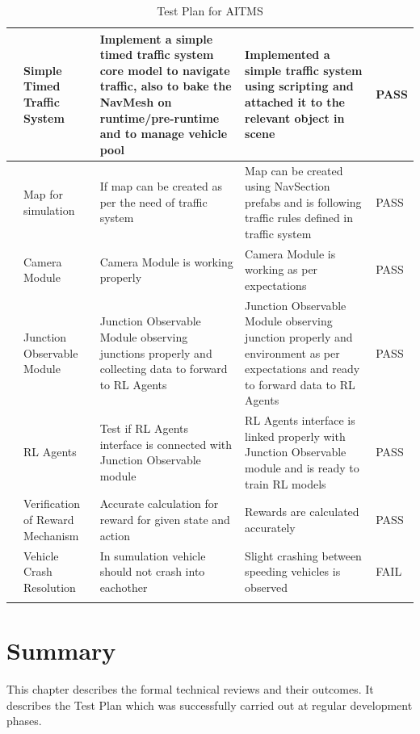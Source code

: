 \documentclass[openany,12pt]{report}
\begin{document}
\begin{longtable}{|p{0.6cm}|p{3.5cm}|p{5cm}|p{3.5cm}|p{1.7cm}|}
			\addtocounter{num}{1}
			\thenum&
			Simple Timed Traffic System&
			Implement a simple timed traffic system core model to navigate traffic, also to bake the NavMesh on runtime/pre-runtime and to manage vehicle pool&
			Implemented a simple traffic system using scripting and attached it to the relevant object in scene&
			PASS\\\hline
			
			\addtocounter{num}{1}
			\thenum&
			Map for simulation&
			If map can be created as per the need of traffic system&
			Map can be created using NavSection prefabs and is following traffic rules defined in traffic system&
			PASS\\\hline
			
			\addtocounter{num}{1}
			\thenum&
			Camera Module&
			Camera Module is working properly&
			Camera Module is working as per expectations&
			PASS\\\hline
			
			\addtocounter{num}{1}
			\thenum&
			Junction Observable Module&
			Junction Observable Module observing junctions properly and collecting data to forward to RL Agents&
			Junction Observable Module observing junction properly and environment as per expectations and ready to forward data to RL Agents&
			PASS\\\hline
			
			\addtocounter{num}{1}
			\thenum&
			RL Agents&
			Test if RL Agents interface is connected with Junction Observable module&
			RL Agents interface is linked properly with Junction Observable module and is ready to train RL models&
			PASS\\\hline
			
			\addtocounter{num}{1}
			\thenum&
			Verification of Reward Mechanism&
			Accurate calculation for reward for given state and action&
			Rewards are calculated accurately&
			PASS\\\hline
			
			\addtocounter{num}{1}
			\thenum&
			Vehicle Crash Resolution&
			In sumulation vehicle should not crash into eachother&
			Slight crashing between speeding vehicles is observed&
			FAIL\\\hline
			
						
			
			\caption{Test Plan for AITMS}
			\label{tab:nnwork}
		\end{longtable}
		
		\section{Summary}
		\hspace{0.5in}This chapter describes the formal technical reviews and their outcomes. It describes the Test Plan which was successfully carried out at regular development phases.\\
\end{document}
